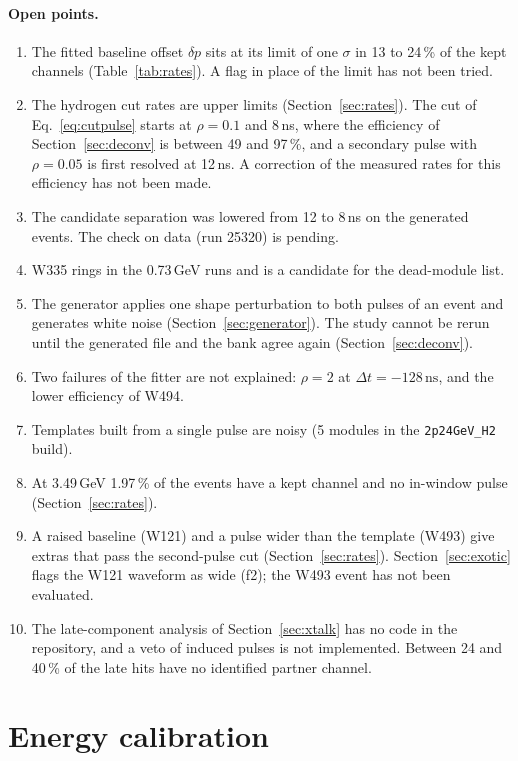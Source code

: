 \documentclass[11pt]{article}
\newcommand{\ns}{\,\mathrm{ns}}
\newcommand{\code}[1]{\texttt{#1}}
\begin{document}
\paragraph{Open points.}
\begin{enumerate}
\item The fitted baseline offset $\delta p$ sits at its limit of one $\sigma$ in 13 to 24\,\% of the kept channels (Table~\ref{tab:rates}). A flag in place of the limit has not been tried.
\item The hydrogen cut rates are upper limits (Section~\ref{sec:rates}). The cut of Eq.~\eqref{eq:cutpulse} starts at $\rho = 0.1$ and 8\,ns, where the efficiency of Section~\ref{sec:deconv} is between 49 and 97\,\%, and a secondary pulse with $\rho = 0.05$ is first resolved at 12\,ns. A correction of the measured rates for this efficiency has not been made.
\item The candidate separation was lowered from 12 to 8\,ns on the generated events. The check on data (run 25320) is pending.
\item W335 rings in the 0.73\,GeV runs and is a candidate for the dead-module list.
\item The generator applies one shape perturbation to both pulses of an event and generates white noise (Section~\ref{sec:generator}). The study cannot be rerun until the generated file and the bank agree again (Section~\ref{sec:deconv}).
\item Two failures of the fitter are not explained: $\rho = 2$ at $\Delta t = -128\ns$, and the lower efficiency of W494.
\item Templates built from a single pulse are noisy (5 modules in the \code{2p24GeV\_H2} build).
\item At 3.49\,GeV 1.97\,\% of the events have a kept channel and no in-window pulse (Section~\ref{sec:rates}).
\item A raised baseline (W121) and a pulse wider than the template (W493) give extras that pass the second-pulse cut (Section~\ref{sec:rates}). Section~\ref{sec:exotic} flags the W121 waveform as wide (f2); the W493 event has not been evaluated.
\item The late-component analysis of Section~\ref{sec:xtalk} has no code in the repository, and a veto of induced pulses is not implemented. Between 24 and 40\,\% of the late hits have no identified partner channel.
\end{enumerate}
\clearpage
\section{Energy calibration}\label{sec:calib}
\end{document}

